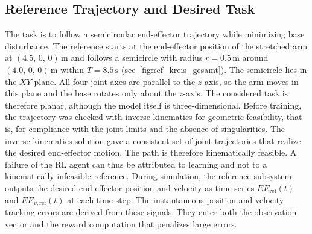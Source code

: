 \documentclass{ieeeaccess}
\begin{document}
\subsection{Reference Trajectory and Desired Task} The task is to follow a semicircular
end-effector trajectory while minimizing base disturbance. The reference starts at the end-effector
position of the stretched arm at $(4.5,\,0,\,0)\,\mathrm{m}$ and follows a semicircle with radius
$r = 0.5\,\mathrm{m}$ around $(4.0,\,0,\,0)\,\mathrm{m}$ within $T = 8.5\,\mathrm{s}$
(see~\cref{fig:ref_kreis_gesamt}). The semicircle lies in the $XY$ plane. All four joint axes
are parallel to the $z$-axis, so the arm moves in this plane and the base rotates only about the
$z$-axis. The considered task is therefore planar, although the model itself is three-dimensional.
Before training, the trajectory was checked with inverse kinematics
for geometric feasibility, that is, for compliance with the joint limits and the absence of
singularities. The inverse-kinematics solution gave a consistent set of joint trajectories that realize
the desired end-effector motion. The path is therefore kinematically feasible. A failure of the RL agent
can thus be attributed to learning and not to a kinematically infeasible reference. During simulation,
the reference subsystem outputs the desired end-effector position and velocity as time series
$EE_{\mathrm{ref}}(t)$ and $EE_{v,\mathrm{ref}}(t)$ at each time step. The instantaneous position and
velocity tracking errors are derived from these signals. They enter both the observation vector and the
reward computation that penalizes large errors.

\end{document}
